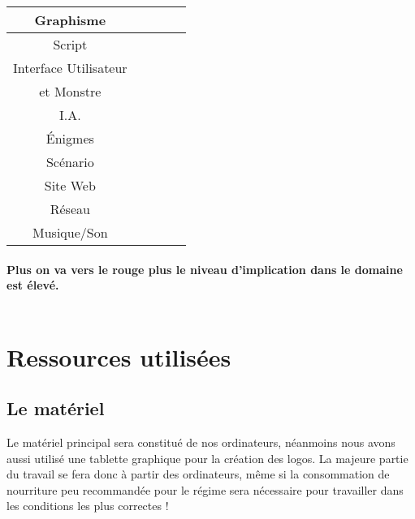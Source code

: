 \documentclass[12pt,a4paper]{article}
\begin{document}
\begin{center}
\begin{tabular}{|c|c|c|c|c|}
 \cellcolor{lightgray}Graphisme & \cellcolor{red} &  &  & \cellcolor{yellow} \\ 
 \hline 
 \cellcolor{lightgray}Script &  & \cellcolor{yellow} & \cellcolor{red} & \cellcolor{yellow} \\ 
 \hline 
  \cellcolor{lightgray} Interface Utilisateur & \cellcolor{yellow}  &  &  & \cellcolor{orange} \\ \cellcolor{lightgray} et Monstre & \cellcolor{yellow}  &  &  & \cellcolor{orange} \\ 
 \hline 
  \cellcolor{lightgray}I.A. &  &  & \cellcolor{red} &  \\ 
 \hline 
  \cellcolor{lightgray}Énigmes & \cellcolor{orange} & \cellcolor{orange} &  &  \\ 
 \hline 
 \cellcolor{lightgray}Scénario & \cellcolor{yellow} & \cellcolor{yellow} & \cellcolor{yellow} & \cellcolor{yellow} \\ 
 \hline 
 \cellcolor{lightgray}Site Web &  & \cellcolor{red} &  &  \\ 
 \hline 
 \cellcolor{lightgray} Réseau & \cellcolor{orange} &  & \cellcolor{yellow}  & \cellcolor{red}  \\ 
 \hline 
 \cellcolor{lightgray}Musique/Son &  & \cellcolor{yellow} &  & \cellcolor{yellow} \\ 
 \hline 
 \end{tabular}
\paragraph{Plus on va vers le rouge plus le niveau d'implication dans le domaine est élevé.} 
\paragraph{}
 \begin{tabular}{|c|c|c|c|}
 \hline 
\cellcolor{white} & \cellcolor{yellow} & \cellcolor{orange} & \cellcolor{red} \\ 
 \hline 
 \end{tabular}

\end{center}
\newpage
\section{Ressources utilisées}
\subsection{Le matériel}
Le matériel principal sera constitué de nos ordinateurs, néanmoins nous avons aussi utilisé une tablette graphique
pour la création des logos.
La majeure partie du travail se fera donc à partir des ordinateurs, même si la consommation de nourriture
peu recommandée pour le régime sera nécessaire pour travailler dans les conditions les plus correctes !
\end{document}
